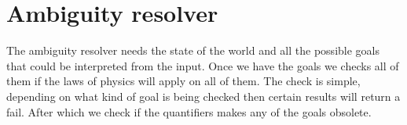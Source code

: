 
\section*{Ambiguity resolver}
The ambiguity resolver needs the state of the world and all the possible goals that could be interpreted from the input.
Once we have the goals we checks all of them if the laws of physics will apply on all of them.
The check is simple, depending on what kind of goal is being checked then certain results will return a fail.
After which we check if the quantifiers makes any of the goals obsolete. %


